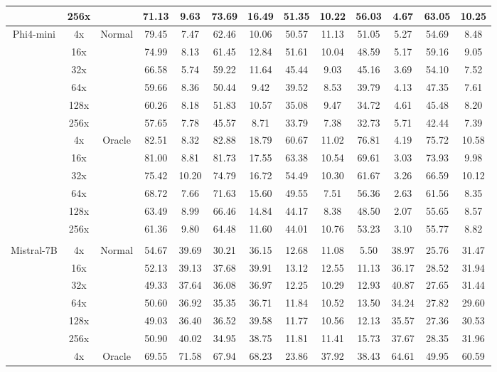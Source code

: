 \documentclass{applemlr}
\numberwithin{equation}{section}
\begin{document}
\begin{table}[H]
\begin{tabular}{c|c|c|cc|cc|cc|cc|cc}
   & 256x &  & 71.13 & 9.63 & 73.69 & 16.49 & 51.35 & 10.22 & 56.03 & 4.67 & 63.05 & 10.25 \\
\hline
 \multirow{12}{*}{Phi4-mini} & 4x &  \multirow{6}{*}{Normal}   & 79.45 & 7.47 & 62.46 & 10.06 & 50.57 & 11.13 & 51.05 & 5.27 & 54.69 & 8.48 \\
  & 16x &  & 74.99 & 8.13 & 61.45 & 12.84 & 51.61 & 10.04 & 48.59 & 5.17 & 59.16 & 9.05 \\
  & 32x &  & 66.58 & 5.74 & 59.22 & 11.64 & 45.44 & 9.03 & 45.16 & 3.69 & 54.10 & 7.52 \\
  & 64x &  & 59.66 & 8.36 & 50.44 & 9.42 & 39.52 & 8.53 & 39.79 & 4.13 & 47.35 & 7.61 \\
  & 128x &  & 60.26 & 8.18 & 51.83 & 10.57 & 35.08 & 9.47 & 34.72 & 4.61 & 45.48 & 8.20 \\
  & 256x &  & 57.65 & 7.78 & 45.57 & 8.71 & 33.79 & 7.38 & 32.73 & 5.71 & 42.44 & 7.39 \\
 \cline{2-13}
        &  4x&  \multirow{6}{*}{Oracle}  & 82.51 & 8.32 & 82.88 & 18.79 & 60.67 & 11.02 & 76.81 & 4.19 & 75.72 & 10.58 \\

   &  16x&  & 81.00 & 8.81 & 81.73 & 17.55 & 63.38 & 10.54 & 69.61 & 3.03 & 73.93 & 9.98 \\

   & 32x &  & 75.42 & 10.20 & 74.79 & 16.72 & 54.49 & 10.30 & 61.67 & 3.26 & 66.59 & 10.12 \\

   & 64x &  & 68.72 & 7.66 & 71.63 & 15.60 & 49.55 & 7.51 & 56.36 & 2.63 & 61.56 & 8.35 \\

   &  128x&  & 63.49 & 8.99 & 66.46 & 14.84 & 44.17 & 8.38 & 48.50 & 2.07 & 55.65 & 8.57 \\

  & 256x &  & 61.36 & 9.80 & 64.48 & 11.60 & 44.01 & 10.76 & 53.23 & 3.10 & 55.77 & 8.82 \\
\hline
\rowcolor{gray!15}
\multicolumn{13}{c}{\textbf{Instruction-tuned-initialized}} \\
 \multirow{12}{*}{Mistral-7B} & 4x & \multirow{6}{*}{Normal} & 54.67 & 39.69 & 30.21 & 36.15 & 12.68 & 11.08 & 5.50 & 38.97 & 25.76 & 31.47 \\
  & 16x &  & 52.13 & 39.13 & 37.68 & 39.91 & 13.12 & 12.55 & 11.13 & 36.17 & 28.52 & 31.94 \\
  & 32x &  & 49.33 & 37.64 & 36.08 & 36.97 & 12.25 & 10.29 & 12.93 & 40.87 & 27.65 & 31.44 \\
  & 64x &  & 50.60 & 36.92 & 35.35 & 36.71 & 11.84 & 10.52 & 13.50 & 34.24 & 27.82 & 29.60 \\
  & 128x &  & 49.03 & 36.40 & 36.52 & 39.58 & 11.77 & 10.56 & 12.13 & 35.57 & 27.36 & 30.53 \\
  & 256x &  & 50.90 & 40.02 & 34.95 & 38.75 & 11.81 & 11.41 & 15.73 & 37.67 & 28.35 & 31.96 \\
\cline{2-13} 
        & 4x & \multirow{6}{*}{Oracle} & 69.55 & 71.58 & 67.94 & 68.23 & 23.86 & 37.92 & 38.43 & 64.61 & 49.95 & 60.59 \\


\end{tabular}
\end{table}
\end{document}
